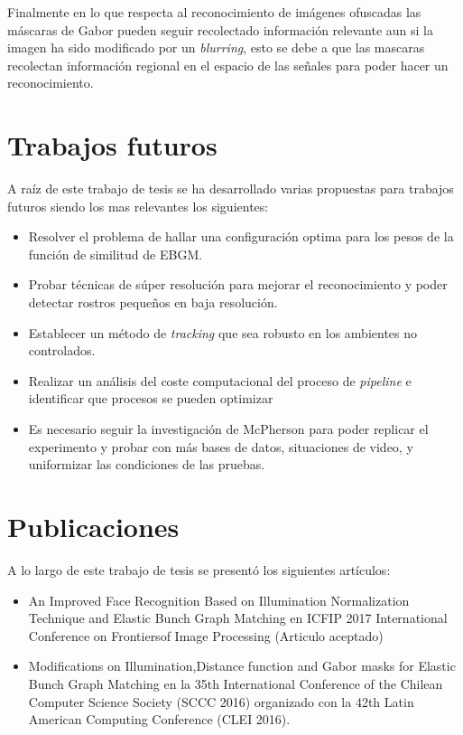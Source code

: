 Finalmente en lo que respecta al reconocimiento de imágenes ofuscadas las máscaras de Gabor pueden seguir recolectado información relevante aun si la imagen ha sido modificado por un \textit{blurring}, esto se debe a que las mascaras recolectan información regional en el espacio de las señales para poder hacer un reconocimiento.

\section{Trabajos futuros}
A raíz de este trabajo de tesis se ha desarrollado varias propuestas para trabajos futuros siendo los mas relevantes los siguientes:
\begin{itemize}
\item Resolver el problema de hallar una configuración optima para los pesos de la función de similitud de \ac{EBGM}.
\item Probar técnicas de súper resolución para mejorar el reconocimiento y poder detectar rostros pequeños en baja resolución.
\item Establecer un método de \textit{tracking} que sea robusto en los ambientes no controlados.
\item Realizar un análisis del coste computacional del proceso de \textit{pipeline} e identificar que procesos se pueden optimizar
\item Es necesario seguir la investigación de McPherson\cite{mcpherson2016defeating} para poder replicar el experimento y probar con más bases de datos, situaciones de video, y uniformizar las condiciones de las pruebas.
\end{itemize}

\section{Publicaciones}
A lo largo de este trabajo de tesis se presentó los siguientes artículos:
\begin{itemize}
\item An Improved Face Recognition Based on Illumination Normalization Technique and Elastic Bunch Graph Matching en ICFIP 2017 International Conference on Frontiersof Image Processing (Articulo aceptado)
\item Modifications on Illumination,Distance function and Gabor masks for Elastic Bunch Graph Matching en la 35th International Conference of the Chilean Computer Science Society (SCCC 2016) organizado con la 42th Latin American Computing Conference (CLEI 2016)\cite{caceresmodifications}.
\end{itemize}

